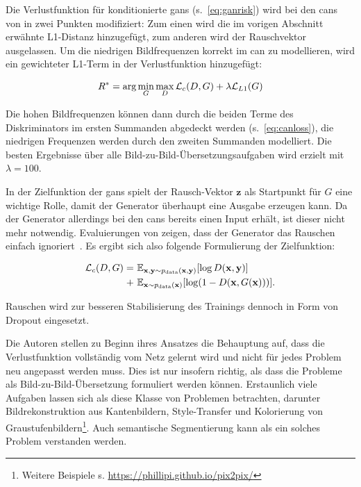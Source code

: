 Die Verlustfunktion für konditionierte \glspl{gan} (s.~\autoref{eq:ganrisk}) wird bei den \glspl{can} von \citeauthor{Isola.2017} in zwei Punkten modifiziert:
Zum einen wird die im vorigen Abschnitt erwähnte L1-Distanz hinzugefügt, zum anderen wird der Rauschvektor ausgelassen.
Um die niedrigen Bildfrequenzen korrekt im \gls{can} zu modellieren, wird ein gewichteter L1-Term in der Verlustfunktion hinzugefügt:

\begin{equation}
R^* = \textup{arg}\min_G \max_D \mathcal{L}_c(D, G) + \lambda \mathcal{L}_{L1}(G)
\end{equation}

Die hohen Bildfrequenzen können dann durch die beiden Terme des Diskriminators im ersten Summanden abgedeckt werden (s.~\autoref{eq:canloss}), die niedrigen Frequenzen werden durch den zweiten Summanden modelliert.
Die besten Ergebnisse über alle Bild-zu-Bild-Übersetzungsaufgaben wird erzielt mit $ \lambda = 100 $.

In der Zielfunktion der \glspl{gan} spielt der Rausch-Vektor $ \mathbf{z} $ als Startpunkt für $ G $ eine wichtige Rolle, damit der Generator überhaupt eine Ausgabe erzeugen kann.
Da der Generator allerdings bei den \glspl{can} bereits einen Input erhält, ist dieser nicht mehr notwendig.
Evaluierungen von \citeauthor{Isola.2017} zeigen, dass der Generator das Rauschen einfach ignoriert~\cite{Isola.2017}.
Es ergibt sich also folgende Formulierung der Zielfunktion:

\begin{equation}\label{eq:canlosswonoise}
\begin{split}
\mathcal{L}_c(D, G) = & \ \mathbb{E}_{\mathbf{x}, \mathbf{y} \sim p_{\textup{data}}(\mathbf{x}, \mathbf{y})} [\log D(\mathbf{x}, \mathbf{y})] \\
+ & \ \mathbb{E}_{\mathbf{x} \sim p_{\textup{data}}(\mathbf{x})} [\log(1 - D(\mathbf{x}, G(\mathbf{x})))].
\end{split}
\end{equation}

Rauschen wird zur besseren Stabilisierung des Trainings dennoch in Form von Dropout eingesetzt.

Die Autoren stellen zu Beginn ihres Ansatzes die Behauptung auf, dass die Verlustfunktion vollständig vom Netz gelernt wird und nicht für jedes Problem neu angepasst werden muss.
Dies ist nur insofern richtig, als dass die Probleme als Bild-zu-Bild-Übersetzung formuliert werden können.
Erstaunlich viele Aufgaben lassen sich als diese Klasse von Problemen betrachten, darunter Bildrekonstruktion aus Kantenbildern, Style-Transfer und Kolorierung von Graustufenbildern\footnote{Weitere Beispiele s. \url{https://phillipi.github.io/pix2pix/}}.
Auch semantische Segmentierung kann als ein solches Problem verstanden werden.



